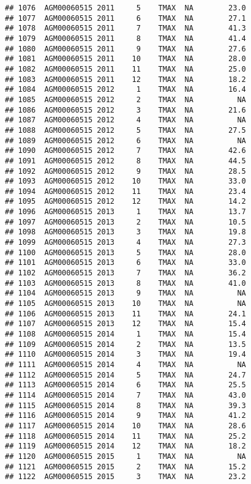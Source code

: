 \documentclass{article}\usepackage[]{graphicx}\usepackage[]{color}
\makeatletter
\newenvironment{kframe}{%
 \def\at@end@of@kframe{}%
 \ifinner\ifhmode%
  \def\at@end@of@kframe{\end{minipage}}%
  \begin{minipage}{\columnwidth}%
 \fi\fi%
 \def\FrameCommand##1{\hskip\@totalleftmargin \hskip-\fboxsep
 \colorbox{shadecolor}{##1}\hskip-\fboxsep
     \hskip-\linewidth \hskip-\@totalleftmargin \hskip\columnwidth}%
 \MakeFramed {\advance\hsize-\width
   \@totalleftmargin\z@ \linewidth\hsize
   \@setminipage}}%
 {\par\unskip\endMakeFramed%
 \at@end@of@kframe}
\newenvironment{knitrout}{}{} %
\makeatother
\begin{document}
\begin{knitrout}
\begin{kframe}
\begin{verbatim}
## 1076  AGM00060515 2011     5    TMAX  NA        23.0
## 1077  AGM00060515 2011     6    TMAX  NA        27.1
## 1078  AGM00060515 2011     7    TMAX  NA        41.3
## 1079  AGM00060515 2011     8    TMAX  NA        41.4
## 1080  AGM00060515 2011     9    TMAX  NA        27.6
## 1081  AGM00060515 2011    10    TMAX  NA        28.0
## 1082  AGM00060515 2011    11    TMAX  NA        25.0
## 1083  AGM00060515 2011    12    TMAX  NA        18.2
## 1084  AGM00060515 2012     1    TMAX  NA        16.4
## 1085  AGM00060515 2012     2    TMAX  NA          NA
## 1086  AGM00060515 2012     3    TMAX  NA        21.6
## 1087  AGM00060515 2012     4    TMAX  NA          NA
## 1088  AGM00060515 2012     5    TMAX  NA        27.5
## 1089  AGM00060515 2012     6    TMAX  NA          NA
## 1090  AGM00060515 2012     7    TMAX  NA        42.6
## 1091  AGM00060515 2012     8    TMAX  NA        44.5
## 1092  AGM00060515 2012     9    TMAX  NA        28.5
## 1093  AGM00060515 2012    10    TMAX  NA        33.0
## 1094  AGM00060515 2012    11    TMAX  NA        23.4
## 1095  AGM00060515 2012    12    TMAX  NA        14.2
## 1096  AGM00060515 2013     1    TMAX  NA        13.7
## 1097  AGM00060515 2013     2    TMAX  NA        10.5
## 1098  AGM00060515 2013     3    TMAX  NA        19.8
## 1099  AGM00060515 2013     4    TMAX  NA        27.3
## 1100  AGM00060515 2013     5    TMAX  NA        28.0
## 1101  AGM00060515 2013     6    TMAX  NA        33.0
## 1102  AGM00060515 2013     7    TMAX  NA        36.2
## 1103  AGM00060515 2013     8    TMAX  NA        41.0
## 1104  AGM00060515 2013     9    TMAX  NA          NA
## 1105  AGM00060515 2013    10    TMAX  NA          NA
## 1106  AGM00060515 2013    11    TMAX  NA        24.1
## 1107  AGM00060515 2013    12    TMAX  NA        15.4
## 1108  AGM00060515 2014     1    TMAX  NA        15.4
## 1109  AGM00060515 2014     2    TMAX  NA        13.5
## 1110  AGM00060515 2014     3    TMAX  NA        19.4
## 1111  AGM00060515 2014     4    TMAX  NA          NA
## 1112  AGM00060515 2014     5    TMAX  NA        24.7
## 1113  AGM00060515 2014     6    TMAX  NA        25.5
## 1114  AGM00060515 2014     7    TMAX  NA        43.0
## 1115  AGM00060515 2014     8    TMAX  NA        39.3
## 1116  AGM00060515 2014     9    TMAX  NA        41.2
## 1117  AGM00060515 2014    10    TMAX  NA        28.6
## 1118  AGM00060515 2014    11    TMAX  NA        25.2
## 1119  AGM00060515 2014    12    TMAX  NA        18.2
## 1120  AGM00060515 2015     1    TMAX  NA          NA
## 1121  AGM00060515 2015     2    TMAX  NA        15.2
## 1122  AGM00060515 2015     3    TMAX  NA        23.2

\end{verbatim}
\end{kframe}
\end{knitrout}
\end{document}
